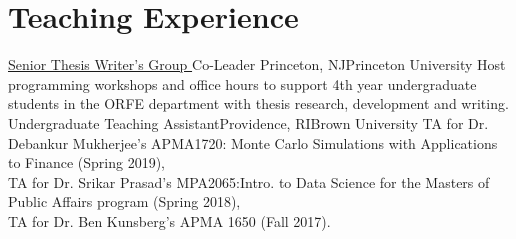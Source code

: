 \documentclass[10pt,a4paper,roman]{moderncv}        %
\begin{document}
\section{Teaching Experience}
{\color{blue}\href{https://orfe.princeton.edu/undergraduate/stwg}{Senior Thesis
    Writer's Group }\color{black} Co-Leader}
{Princeton, NJ}{Princeton University}
{Host programming workshops and office hours to support
  4th year undergraduate students in the ORFE department with thesis research, development and writing.}
{Undergraduate Teaching Assistant}{Providence, RI}{Brown University}
{TA for Dr. Debankur Mukherjee's APMA1720: Monte Carlo Simulations with Applications to Finance (Spring 2019), \\
TA for Dr. Srikar Prasad's MPA2065:Intro. to Data Science for the Masters of Public Affairs program (Spring 2018),
\\
TA for Dr. Ben Kunsberg's APMA 1650 (Fall 2017).
}

\end{document}
